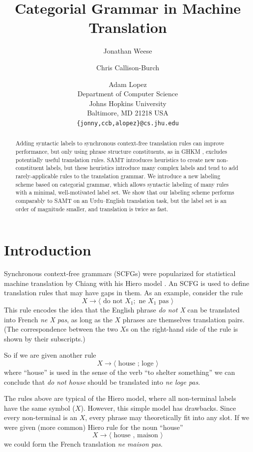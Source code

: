 \documentclass{article}
\author{Jonathan Weese \and Chris Callison-Burch \and Adam Lopez\\Department of Computer Science\\Johns Hopkins University\\Baltimore, MD 21218 USA\\{\tt \{jonny,ccb,alopez\}@cs.jhu.edu}}
\title{Categorial Grammar in Machine Translation}
\begin{document}
\maketitle

\begin{abstract}
Adding syntactic labels to synchronous context-free translation rules can improve performance, but only using phrase structure constituents, as in GHKM \cite{ghkm}, excludes potentially useful translation rules. SAMT \cite{samt-wmt06} introduces heuristics to create new non-constituent labels, but these heuristics introduce many complex labels and tend to add rarely-applicable rules to the translation grammar. We introduce a new labeling scheme based on categorial grammar, which allows syntactic labeling of many rules with a minimal, well-motivated label set. We show that our labeling scheme performs comparably to SAMT on an Urdu--English translation task, but the label set is an order of magnitude smaller, and translation is twice as fast.
\end{abstract}

\section{Introduction}

Synchronous context-free grammars (SCFGs) were popularized for statistical machine translation by Chiang with his Hiero model . An SCFG is used to define translation rules that may have gaps in them.
As an example, consider the rule
\begin{equation}
X \to \langle \textrm{ do not } X_1 ; \textrm{ ne } X_1 \textrm{ pas } \rangle \label{rule:ne_pas}
\end{equation}
This rule encodes the idea that the English phrase {\em do not X} can be translated into French {\em ne X pas}, as long as the $X$ phrases are themselves translation pairs. (The correspondence between the two $X$s on the right-hand side of the rule is shown by their subscripts.)

So if we are given another rule
\begin{equation}
X \to \langle \textrm{ house ; loge } \rangle
\end{equation}
where ``house'' is used in the sense of the verb ``to shelter something'' we can conclude that {\em do not house} should be translated into {\em ne loge pas}.

The rules above are typical of the Hiero model, where all non-terminal labels have the same symbol ($X$). However, this simple model has drawbacks. Since every non-terminal is an $X$, every phrase may theoretically fit into any slot. If we were given (more common) Hiero rule for the noun ``house''
\begin{equation}
X \to \langle \textrm{ house , maison } \rangle
\end{equation}
we could form the French translation {\em ne maison pas}. 
\end{document}
